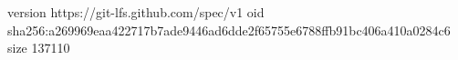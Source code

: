 version https://git-lfs.github.com/spec/v1
oid sha256:a269969eaa422717b7ade9446ad6dde2f65755e6788ffb91bc406a410a0284c6
size 137110
